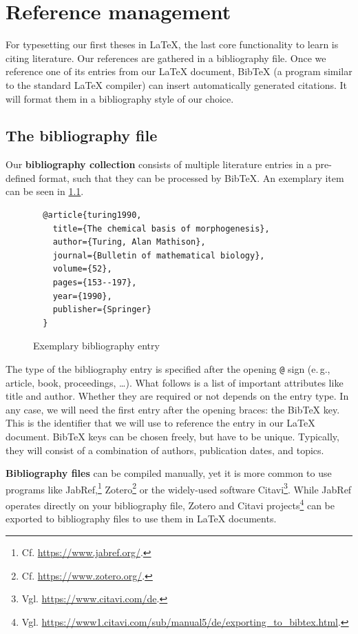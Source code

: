 \chapter{Reference management}
\label{sec:literature}

For typesetting our first theses in \LaTeX{}, the last core functionality to learn is citing literature.
Our references are gathered in a bibliography file.
Once we reference one of its entries from our \LaTeX{} document, Bib\TeX{} (a 
program similar to the standard \LaTeX{} compiler) can insert automatically generated citations.
It will format them in a bibliography style of our choice.

\section{The bibliography file}
Our \textbf{bibliography collection} consists of multiple literature entries in a pre-defined format, such that they can be processed by Bib\TeX{}.
An exemplary item can be seen in \cref{lst:bibfile-sample-entry}.

\begin{figure}[H]
  \begin{verbatim}
  @article{turing1990,
    title={The chemical basis of morphogenesis},
    author={Turing, Alan Mathison},
    journal={Bulletin of mathematical biology},
    volume={52},
    pages={153--197},
    year={1990},
    publisher={Springer}
  }
  \end{verbatim}
  \caption{Exemplary bibliography entry}
  \label{lst:bibfile-sample-entry}
\end{figure}

The type of the bibliography entry is specified after the opening \texttt{@} sign (e.\,g., article, book, proceedings, …).
What follows is a list of important attributes like title and author.
Whether they are required or not depends on the entry type.
In any case, we will need the first entry after the opening braces: the Bib\TeX{} key.
This is the identifier that we will use to reference the entry in our \LaTeX{} document.
Bib\TeX{} keys can be chosen freely, but have to be unique.
Typically, they will consist of a combination of authors, publication dates, and topics.

\textbf{Bibliography files} can be compiled manually, yet it is more common to use programs like JabRef,\footnote{Cf. \url{https://www.jabref.org/}.} Zotero\footnote{Cf. \url{https://www.zotero.org/}.} or the widely-used software Citavi\footnote{Vgl. \url{https://www.citavi.com/de}.}.
While JabRef operates directly on your bibliography file, Zotero and Citavi projects\footnote{Vgl. \url{https://www1.citavi.com/sub/manual5/de/exporting_to_bibtex.html}.} can be exported to bibliography files to use them in \LaTeX{} documents.

